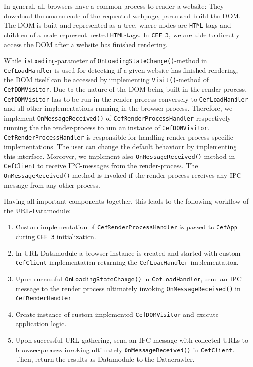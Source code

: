 In general, all browsers have a common process to render a website: They download the source code of the requested webpage, parse and build the DOM. The DOM is built and represented as a tree, where nodes are \texttt{HTML}-tags and children of a node represent nested \texttt{HTML}-tags. In \texttt{CEF 3}, we are able to directly access the DOM after a website has finished rendering. 

While \texttt{isLoading}-parameter of \texttt{OnLoadingStateChange()}-method in \texttt{CefLoadHandler} is used for detecting if a given website has finished rendering, the DOM itself can be accessed by implementing \texttt{Visit()}-method of \texttt{CefDOMVisitor}.
Due to the nature of the DOM being built in the render-process, \texttt{CefDOMVisitor} has to be run in the render-process conversely to \texttt{CefLoadHandler} and all other implementations running in the browser-process. Therefore, we implement \texttt{OnMessageReceived()} of \texttt{CefRenderProcessHandler} respectively running the the render-process to run an instance of \texttt{CefDOMVisitor}. \texttt{CefRenderProcessHandler} is responsible for handling render-process-specific implementations. The user can change the default behaviour by implementing this interface. Moreover, we implement also \texttt{OnMessageReceived()}-method in \texttt{CefClient} to receive IPC-messages from the render-process. The \texttt{OnMessageReceived()}-method is invoked if the render-process receives any IPC-message from any other process.

Having all important components together, this leads to the following workflow of the URL-Datamodule:

\begin{enumerate}
	\item Custom implementation of \texttt{CefRenderProcessHandler} is passed to \texttt{CefApp} during \texttt{CEF 3} initialization.
	\item In URL-Datamodule a browser instance is created and started with custom \texttt{CefClient} implementation returning the \texttt{CefLoadHandler} implementation.
	\item Upon successful \texttt{OnLoadingStateChange()} in \texttt{CefLoadHandler}, send an IPC-message to the render process ultimately invoking \texttt{OnMessageReceived()} in \texttt{CefRenderHandler}
	\item Create instance of custom implemented \texttt{CefDOMVisitor} and execute application logic.
	\label{point_implement_cefdomvisitor}
	\item Upon successful URL gathering, send an IPC-message with collected URLs to browser-process invoking ultimately \texttt{OnMessageReceived()} in \texttt{CefClient}. Then, return the results as Datamodule to the Datacrawler.
\end{enumerate}  

